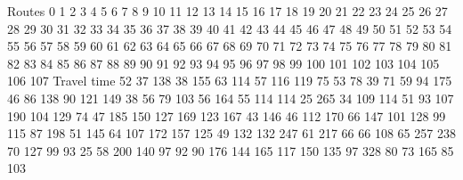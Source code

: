 Routes	0	1	2	3	4	5	6	7	8	9	10	11	12	13	14	15	16	17	18	19	20	21	22	23	24	25	26	27	28	29	30	31	32	33	34	35	36	37	38	39	40	41	42	43	44	45	46	47	48	49	50	51	52	53	54	55	56	57	58	59	60	61	62	63	64	65	66	67	68	69	70	71	72	73	74	75	76	77	78	79	80	81	82	83	84	85	86	87	88	89	90	91	92	93	94	95	96	97	98	99	100	101	102	103	104	105	106	107	
Travel time	52	37	138	38	155	63	114	57	116	119	75	53	78	39	71	59	94	175	46	86	138	90	121	149	38	56	79	103	56	164	55	114	114	25	265	34	109	114	51	93	107	190	104	129	74	47	185	150	127	169	123	167	43	146	46	112	170	66	147	101	128	99	115	87	198	51	145	64	107	172	157	125	49	132	132	247	61	217	66	66	108	65	257	238	70	127	99	93	25	58	200	140	97	92	90	176	144	165	117	150	135	97	328	80	73	165	85	103	
